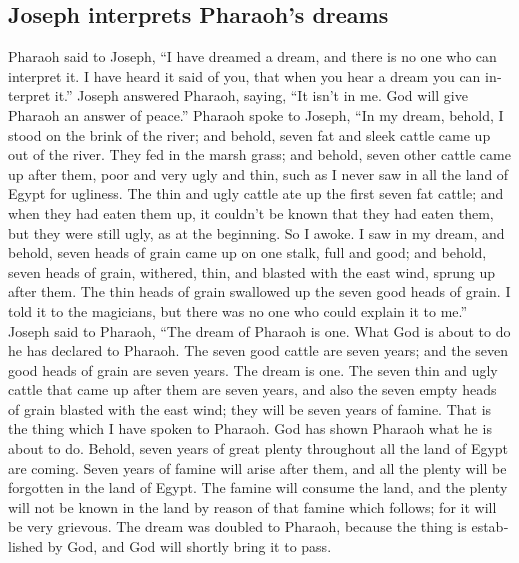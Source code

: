 \begin{paracol}{2}
\begin{otherlanguage}{english}
\hypertarget{joseph-interprets-pharaohs-dreams}{%
\subsection{Joseph interprets Pharaoh's
dreams}\label{joseph-interprets-pharaohs-dreams}}

 Pharaoh said to Joseph, ``I have dreamed a dream, and
there is no one who can interpret it. I have heard it said of you, that
when you hear a dream you can interpret it.''  Joseph
answered Pharaoh, saying, ``It isn't in me. God will give Pharaoh an
answer of peace.''  Pharaoh spoke to Joseph, ``In my
dream, behold, I stood on the brink of the river;  and
behold, seven fat and sleek cattle came up out of the river. They fed in
the marsh grass;  and behold, seven other cattle came up
after them, poor and very ugly and thin, such as I never saw in all the
land of Egypt for ugliness.  The thin and ugly cattle ate
up the first seven fat cattle;  and when they had eaten
them up, it couldn't be known that they had eaten them, but they were
still ugly, as at the beginning. So I awoke.  I saw in my
dream, and behold, seven heads of grain came up on one stalk, full and
good;  and behold, seven heads of grain, withered, thin,
and blasted with the east wind, sprung up after them. 
The thin heads of grain swallowed up the seven good heads of grain. I
told it to the magicians, but there was no one who could explain it to
me.''  Joseph said to Pharaoh, ``The dream of Pharaoh is
one. What God is about to do he has declared to Pharaoh. 
The seven good cattle are seven years; and the seven good heads of grain
are seven years. The dream is one.  The seven thin and
ugly cattle that came up after them are seven years, and also the seven
empty heads of grain blasted with the east wind; they will be seven
years of famine.  That is the thing which I have spoken
to Pharaoh. God has shown Pharaoh what he is about to do.
 Behold, seven years of great plenty throughout all the
land of Egypt are coming.  Seven years of famine will
arise after them, and all the plenty will be forgotten in the land of
Egypt. The famine will consume the land,  and the plenty
will not be known in the land by reason of that famine which follows;
for it will be very grievous.  The dream was doubled to
Pharaoh, because the thing is established by God, and God will shortly
bring it to pass.


\end{otherlanguage}
\end{paracol}
